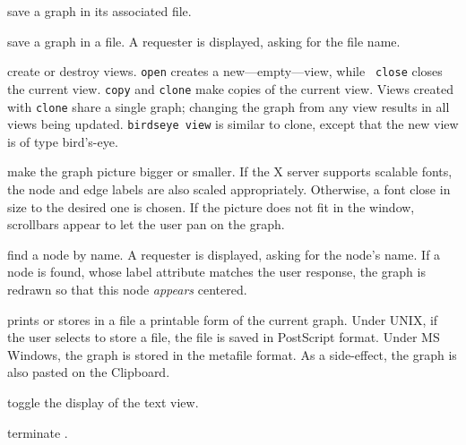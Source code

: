 \begin{description}
\begin{list}{}{
\renewcommand{\leftmargin}{1.1in}
\renewcommand{\labelwidth}{1.1in}
\renewcommand{\makelabel}[1]{#1\hfil}
}
\item[{\parbox[b]{1.1in}{\tt save graph}}]
save a graph in its associated {\DOT} file.

\item[{\parbox[b]{1.1in}{\tt save graph as}}]
save a graph in a {\DOT} file.  A requester is displayed, asking for the
file name.

\item[{\parbox[b]{1.1in}{\tt open view\newline copy view\newline clone view\newline birdseye view\newline close view}}]
create or destroy views. {\tt open} creates a new---empty---view, while {\tt
close} closes the current view. {\tt copy} and {\tt clone} make copies of the
current view. Views created with {\tt clone} share a single graph; changing the
graph from any view results in all views being updated. {\tt birdseye view} is
similar to clone, except that the new view is of type bird's-eye.

\item[{\parbox[b]{1.1in}{\tt zoom in\newline zoom out}}]
make the graph picture bigger or smaller.  If the X server supports scalable
fonts, the node and edge labels are also scaled appropriately. Otherwise, a
font close in size to the desired one is chosen.  If the picture does not fit
in the window, scrollbars appear to let the user pan on the graph.

\item[{\parbox[b]{1.1in}{\tt find node}}]
find a node by name. A requester is displayed, asking for the node's name.  If
a node is found, whose label attribute matches the user response, the graph is
redrawn so that this node {\em appears} centered.

\item[{\parbox[b]{1.1in}{\tt print graph}}]
prints or stores in a file a printable form of the current graph.  Under UNIX,
if the user selects to store a file, the file is saved in PostScript
format. Under MS Windows, the graph is stored in the metafile format. As a
side-effect, the graph is also pasted on the Clipboard.

\item[{\parbox[b]{1.1in}{\tt text view}}]
toggle the display of the {\LEFTY} text view.

\item[{\parbox[b]{1.1in}{\tt quit}}]
terminate {\DOTTY}.
\end{list}


\end{description}
